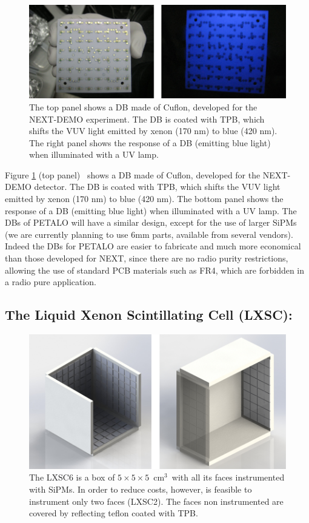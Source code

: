 \documentclass{JINST}
\begin{document}
\begin{figure}[!htb]
	\centering
	\includegraphics[scale=0.5]{img/DC.png}
	\caption{\label{fig.DB} The top panel shows a DB made of Cuflon, developed for the NEXT-DEMO experiment. The DB is coated with TPB, which shifts the VUV light emitted by xenon (170 nm) to blue (420 nm). The right panel shows the response of a DB (emitting blue light) when illuminated with a UV lamp.  }
\end{figure}

Figure \ref{fig.DB} (top panel) ~shows a DB made of Cuflon, developed for the NEXT-DEMO detector. The DB is coated with TPB, which shifts the VUV light emitted by xenon (170 nm) to blue (420 nm). The bottom panel shows the response of a DB (emitting blue light) when illuminated with a UV lamp. The DBs of PETALO will have a similar design, except for the use of larger SiPMs (we are currently planning to use 6mm parts, available from several vendors).
Indeed the DBs for PETALO are easier to fabricate and much more economical than those developed for NEXT, since there are no radio purity restrictions, allowing the use of standard PCB materials such as FR4, which are forbidden in a radio pure application.

\subsection{The Liquid Xenon Scintillating Cell (LXSC):}

\label{sec.lxsc}

\begin{figure}[!htb]
	\centering
	\includegraphics[scale=0.5]{img/lxsc2.png}
	\caption{\label{fig.box} The LXSC6 is a box of 
	$5\times 5 \times 5$~cm$^3$~with all its faces instrumented with SiPMs. In order to reduce costs, however, is feasible to instrument only two faces (LXSC2). The faces non instrumented are covered by reflecting teflon coated with TPB. }
\end{figure}
\end{document}
